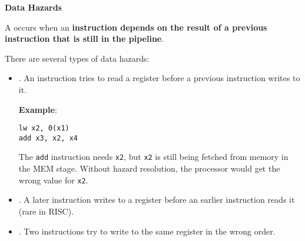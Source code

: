 \highspace
\begin{flushleft}
    \textcolor{Red2}{ \textbf{Data Hazards}}
\end{flushleft}
A  occurs when an \textbf{instruction depends on the result of a previous instruction that is still in the pipeline}.

\highspace
There are several types of data hazards:
\begin{itemize}
    \item {}. An instruction tries to read a register before a previous instruction writes to it.

    \textcolor{Green3}{ \textbf{Example}}:
    \begin{lstlisting}[language=riscv]
lw x2, 0(x1)
add x3, x2, x4\end{lstlisting}
    The \texttt{add} instruction needs \texttt{x2}, but \texttt{x2} is still being fetched from memory in the MEM stage. Without hazard resolution, the processor would get the wrong value for \texttt{x2}.

    \item {}. A later instruction writes to a register before an earlier instruction reads it (rare in RISC).

    \item {}. Two instructions try to write to the same register in the wrong order.
\end{itemize}